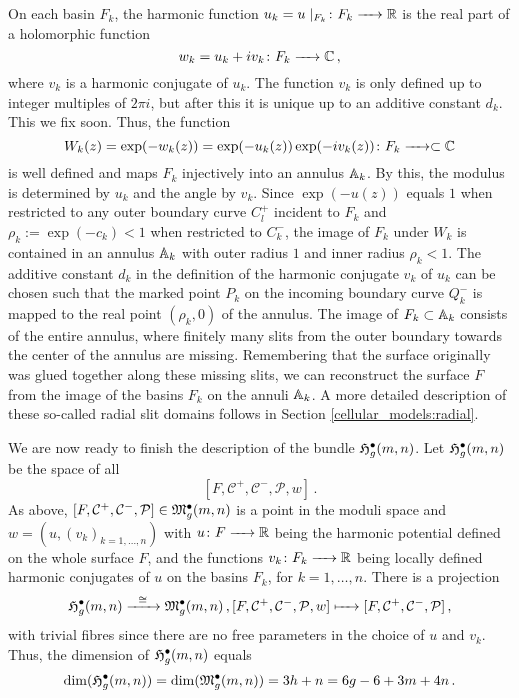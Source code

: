 On each basin $F_k$, the harmonic function $u_k = u \mid_{F_k} \colon F_k \xrightarrow{\hspace{6pt}{}\hspace{6pt}} \mathbb R$ is the real part of a holomorphic function
\[
   w_k = u_k + i v_k \colon F_k \xrightarrow{\hspace{6pt}{}\hspace{6pt}} \mathbb C\,,
\]
where $v_k$ is a harmonic conjugate of $u_k$.
The function $v_k$ is only defined up to integer multiples of $2\pi i$,
but after this it is unique up to an additive constant $d_k$.
This we fix soon.
Thus, the function
\[
 W_k(z) = \exp(-w_k(z)) = \exp(-u_k(z)) \exp(-i v_k(z)) \colon F_k \xrightarrow{\hspace{6pt}{}\hspace{6pt}} \subset \mathbb C
\]
is well defined and maps $F_k$ injectively into an annulus $\mathbb A_k$. 
By this, the modulus is determined by $u_k$ and the angle by $v_k$. 
Since $\exp(-u(z))$ equals $1$ when restricted to any outer boundary curve $C^+_l$ incident to $F_k$ 
and $\rho_k := \exp(-c_k) < 1$ when restricted to $C^-_k$,
the image of $F_k$ under $W_k$ is contained in an annulus $\mathbb A_k$ with outer radius $1$ and inner radius $\rho_k < 1$.
The additive constant $d_k$ in the definition of the harmonic conjugate $v_k$ of $u_k$ 
can be chosen such that the marked point $P_k$ on the incoming boundary curve $Q^-_k$ is mapped to the real point $(\rho_k, 0)$ of the annulus.
The image of $F_k \subset \mathbb A_k$ consists of the entire annulus, 
where finitely many slits from the outer boundary towards the center of the annulus are missing.
Remembering that the surface originally was glued together along these missing slits,
we can reconstruct the surface $F$ from the image of the basins $F_k$ on the annuli $\mathbb A_k$.
A more detailed description of these so-called radial slit domains follows in Section \ref{cellular_models:radial}.

We are now ready to finish the description of the bundle $\mathfrak{H}^{\bullet}_g(m, n)$.
Let $\mathfrak{H}^{\bullet}_g(m, n)$ be the space of all 
\[
   [F, \mathcal C^+, \mathcal C^-, \mathcal P, w]\,.
\] 
As above, $[F, \mathcal C^+, \mathcal C^-, \mathcal P] \in \mathfrak{M}^\bullet_g(m, n)$ is a point in the moduli space
and $w = (u, (v_k)_{k = 1, \dotsc, n})$ with
$u \colon F \xrightarrow{\hspace{6pt}{}\hspace{6pt}} \mathbb R$ being the harmonic potential defined on the whole surface $F$,
and the functions $v_k \colon F_k \xrightarrow{\hspace{6pt}{}\hspace{6pt}} \mathbb R$ being locally defined harmonic conjugates of $u$ on the basins $F_k$, for $k = 1, \dotsc, n$.
There is a projection
\[
  \mathfrak{H}^{\bullet}_g(m, n) \xrightarrow{\hspace{6pt}{\cong}\hspace{6pt}} \mathfrak{M}^\bullet_g(m, n)\,, [F, \mathcal C^+, \mathcal C^-, \mathcal P, w] \xmapsto{\hspace{6pt}{}\hspace{6pt}} [F, \mathcal C^+, \mathcal C^-, \mathcal P]\,,
\]
 with trivial fibres since there are no free parameters in the choice of $u$ and $v_k$.
Thus, the dimension of $\mathfrak{H}^{\bullet}_g(m, n)$ equals
\[
 \dim(\mathfrak{H}^{\bullet}_g(m, n)) = \dim(\mathfrak{M}^\bullet_g(m, n)) = 3h + n = 6g - 6 + 3 m + 4 n\,.
\]
